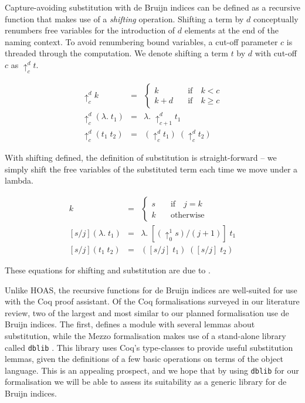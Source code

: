 \documentclass[]{unswthesis}
\newcommand{\SSPHS}{\text{SSPHS }}
\let\c\texttt
\let\i\textit
\begin{document}
Capture-avoiding substitution with de Bruijn indices can be defined as a recursive function that makes use of a \i{shifting} operation. Shifting a term by $d$ conceptually renumbers free variables for the introduction of $d$ elements at the end of the naming context. To avoid renumbering bound variables, a cut-off parameter $c$ is threaded through the computation. We denote shifting a term $t$ by $d$ with cut-off $c$ as $\uparrow^d_c t$.

\begin{eqnarray*}
\uparrow^d_c k & = &
  \begin{cases}
  k \quad & \text{if} \quad k < c \\
  k + d \quad & \text{if} \quad k \geq c
  \end{cases}\\
\uparrow^d_c (\lambda. \; t_1) & = & \lambda. \; \uparrow^d_{c + 1} t_1\\
\uparrow^d_c (t_1 \; t_2) & = & (\uparrow^d_c t_1) \; (\uparrow^d_c t_2)
\end{eqnarray*}

With shifting defined, the definition of substitution is straight-forward -- we simply shift the free variables of the substituted term each time we move under a lambda.

\begin{eqnarray*}
[s/j]k & = &
  \begin{cases}
  s \quad & \text{if} \quad j = k \\
  k \quad & \text{otherwise}
  \end{cases}\\
\left[s/j\right](\lambda. \; t_1) & = & \lambda. \; [(\uparrow^1_0 s)/(j + 1)] \; t_1\\
\left[s/j\right](t_1 \; t_2) & = & ([s/j] \; t_1) \; ([s/j] \; t_2)
\end{eqnarray*}

These equations for shifting and substitution are due to \cite{tapl}.

Unlike HOAS, the recursive functions for de Bruijn indices are well-suited for use with the Coq proof assistant. Of the Coq formalisations surveyed in our literature review, two of the largest and most similar to our planned formalisation use de Bruijn indices. The first, \SSPHS \cite{pottier13} defines a module with several lemmas about substitution, while the Mezzo formalisation \cite{mezzo14} makes use of a stand-alone library called \c{dblib} \cite{dblib13}. This library uses Coq's type-classes to provide useful substitution lemmas, given the definitions of a few basic operations on terms of the object language. This is an appealing prospect, and we hope that by using \c{dblib} for our formalisation we will be able to assess its suitability as a generic library for de Bruijn indices.
\end{document}
